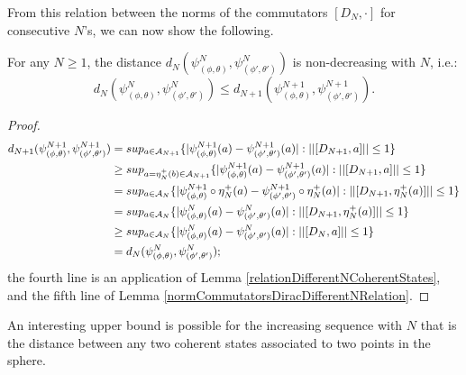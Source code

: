 From this relation between the norms of the commutators $[D_N, \cdot]$ for consecutive $N$'s, we can now show the following.

\begin{theorem}\label{nondecreasingDistanceRelatingNCoherent}
For any $N \geq 1$, the distance $d_N(\psi^N_{(\phi, \theta)}, \psi^N_{(\phi', \theta')})$ is non-decreasing with $N$, i.e.:
\begin{equation}
    d_N(\psi^N_{(\phi, \theta)}, \psi^N_{(\phi', \theta')}) \leq d_{N+1}(\psi^{N+1}_{(\phi, \theta)}, \psi^{N+1}_{(\phi', \theta')}).
\end{equation}
\end{theorem}
\begin{proof}
\begin{align*}
    d_{N+1}(\psi^{N+1}_{(\phi, \theta)}, \psi^{N+1}_{(\phi', \theta')}) 
        &= sup_{a \in \acal_{N+1}} \{|\psi^{N+1}_{(\phi, \theta)}(a) - \psi^{N+1}_{(\phi', \theta')}(a)| : ||[D_{N+1}, a]|| \leq 1\} \\
        &\geq sup_{a = \eta_N^+(b) \in \acal_{N+1}} \{|\psi^{N+1}_{(\phi, \theta)}(a) - \psi^{N+1}_{(\phi', \theta')}(a)| : ||[D_{N+1}, a]|| \leq 1\}\\
        &= sup_{a \in \acal_{N}} \{|\psi^{N+1}_{(\phi, \theta)}\circ \eta_N^+(a) - \psi^{N+1}_{(\phi', \theta')}\circ \eta_N^+(a)| : ||[D_{N+1},  \eta_N^+(a)]|| \leq 1\} \\
        &= sup_{a \in \acal_{N}} \{|\psi^{N}_{(\phi, \theta)}(a) - \psi^{N}_{(\phi', \theta')}(a)| : ||[D_{N+1}, \eta_N^+(a)]|| \leq 1\}\\
        &\geq sup_{a \in \acal_{N}} \{|\psi^{N}_{(\phi, \theta)}(a) - \psi^{N}_{(\phi', \theta')}(a)| : ||[D_{N}, a]|| \leq 1\} \\
        &= d_N(\psi^{N}_{(\phi, \theta)}, \psi^{N}_{(\phi', \theta')});
\end{align*} the fourth line is an application of Lemma \ref{relationDifferentNCoherentStates}, and the fifth line of Lemma \ref{normCommutatorsDiracDifferentNRelation}.
\end{proof}

\lin

An interesting upper bound is possible for the increasing sequence with $N$ that is the distance between any two coherent states associated to two points in the sphere.

